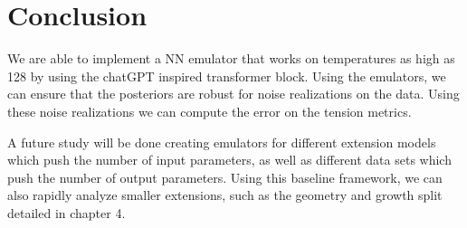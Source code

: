 \section{Conclusion}
We are able to implement a NN emulator that works on temperatures as high as 128 by using the chatGPT inspired transformer block. Using the emulators, we can ensure that the posteriors are robust for noise realizations on the data. Using these noise realizations we can compute the error on the tension metrics.

A future study will be done creating emulators for different extension models which push the number of input parameters, as well as different data sets which push the number of output parameters. Using this baseline framework, we can also rapidly analyze smaller extensions, such as the geometry and growth split detailed in chapter 4.








